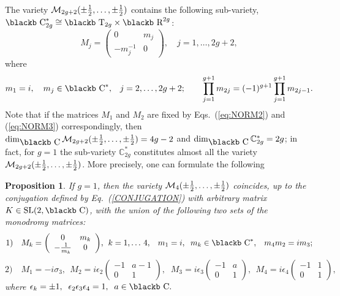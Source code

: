 \documentclass[11pt]{article}
\def\Bbb#1{\hbox{\blackb #1}}
\newtheorem{proposition}{Proposition}[section]
\def\C{\mathbb{C}}
\begin{document}
The variety ${\cal M}_{2g+2}(\pm\frac 12,\dots,\pm\frac 12)$ contains 
the following sub-variety, 
${\Bbb C}_{2g}^*\cong\Bbb T_{2g}\times\Bbb R^{2g}$:
\begin{equation}
  \label{eq:CYLINDERS}
M_j=\left(\begin{array}{cc}
0&m_j\\
-m_j^{-1}&0\end{array}\right),\quad j=1,\dots,2g+2,
\end{equation}
where 
\begin{equation}
  \label{eq:CYLINDERS_CONDITIONS}
  m_1=i,\quad m_j\in\Bbb C^*,\;\;\;j=2,\dots,2g+2;\quad\quad
\prod\limits_{j=1}^{g+1}m_{2j}=(-1)^{g+1}\prod\limits_{j=1}^{g+1}m_{2j-1}.
\end{equation}
Note that if the matrices $M_1$ and $M_2$ are fixed by Eqs.~(\ref{eq:NORM2})
and (\ref{eq:NORM3}) correspondingly, then
$\dim_{\Bbb C}{\cal M}_{2g+2}(\pm\frac 12,\dots,\pm\frac 12)=4g-2$ and
$\dim_{\Bbb C}\C_{2g}^*=2g$;
in fact, for $g=1$ the sub-variety $\C_{2g}^*$ constitutes almost all 
the variety ${\cal M}_{2g+2}(\pm\frac 12,\dots,\pm\frac 12)$. More precisely,
one can formulate the following
\begin{proposition}{\rm\cite{H}}\label{HITCHIN_M_4}
If $g=1$, then the variety 
${\cal M}_{4}(\pm\frac 12,\dots,\pm\frac 12)$ coincides, up to the
conjugation defined by Eq.~{\rm (\ref{CONJUGATION})} with arbitrary matrix 
$K\in{\rm SL}(2,\Bbb C)$, with the union of the following two sets of the
monodromy matrices:
\begin{equation}
  \label{eq:SET_GENERAL}
1)\quad M_k=\left(\begin{array}{cc}
0&m_k\\
-\frac 1{m_k}&0
\end{array}\right)\!,\;\,k=1,\dots\,4,\;\;\;m_1=i,\;\;
m_k\in\Bbb C^*,\;\;\;m_4m_2=im_3;
\end{equation}
\begin{equation}
  \label{eq:SET_SPECIAL}
2)\quad  M_1=-i\sigma_3,\;\,
M_2=i\epsilon_2\!\left(\!\!\!\begin{array}{cc}
-1&a-1\\
0&1
\end{array}\!\!\!\right)\!\!,\;\;
M_3=i\epsilon_3\!\left(\!\!\!\begin{array}{cc}
-1&a\\
0&1
\end{array}\!\!\!\right)\!\!,\;\,
M_4=i\epsilon_4\!\left(\!\!\!\begin{array}{cc}
-1&1\\
0&1
\end{array}\!\!\!\right)\!\!,\!\!\!
\end{equation}
where
$
\epsilon_k=\pm 1,\;\;\epsilon_2\epsilon_3\epsilon_4=1,\;\;a\in\Bbb C.
$
\end{proposition}
\end{document}
